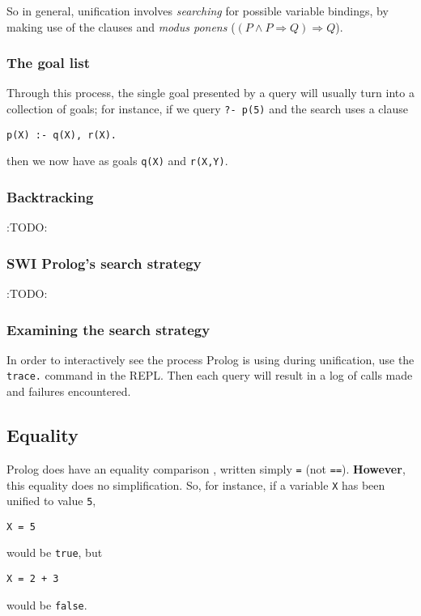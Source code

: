 \documentclass[11pt]{article}
\begin{document}
So in general, unification involves \emph{searching} for possible
variable bindings, by making use of the clauses
and \emph{modus ponens} (\((P ∧ P ⇒ Q) ⇒ Q\)).

\subsubsection{The goal list}
\label{sec:org8cd46c3}

Through this process, the single goal presented by a query
will usually turn into a collection of goals;
for instance, if we query \texttt{?- p(5)} and the search uses a clause
\begin{verbatim}
p(X) :- q(X), r(X).
\end{verbatim}
then we now have as goals \texttt{q(X)} and \texttt{r(X,Y)}.

\subsubsection{Backtracking}
\label{sec:org90f7827}
:TODO:

\subsubsection{SWI Prolog's search strategy}
\label{sec:orgbb07203}
:TODO:

\subsubsection{Examining the search strategy}
\label{sec:org0663483}
In order to interactively see the process Prolog is using
during unification,
use the \texttt{trace.} command in the REPL.
Then each query will result in a log of calls made and
failures encountered.

\subsection{Equality}
\label{sec:org6ec4c1d}
Prolog does have an equality comparison , written simply \texttt{=} (not \texttt{==}).
\textbf{However}, this equality does no simplification.
So, for instance, if a variable \texttt{X} has been unified to value \texttt{5},
\begin{verbatim}
X = 5
\end{verbatim}
would be \texttt{true}, but
\begin{verbatim}
X = 2 + 3
\end{verbatim}
would be \texttt{false}.
\end{document}
